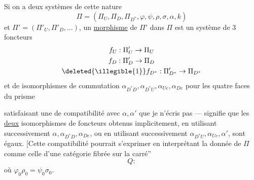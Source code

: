 Si on a deux systèmes de cette nature
\[
\Pi=(\Pi_U,\Pi_D,\Pi_{D^*},\varphi,\psi,\rho,\sigma,\alpha,k)
\]
et $\Pi'=(\Pi'_U,\Pi'_D,\ldots)$, un \uline{morphisme}
de $\Pi'$ dans $\Pi$ est un système de $3$ foncteurs
\[
\begin{gathered}
f_U:\Pi'_U\to\Pi_U\\
f_D:\Pi'_D\to\Pi_D\\
\deleted{\illegible{1}}f_{D^*}:\Pi'_{D^*}\to\Pi_{D^*}
\end{gathered}
\]
et de 
isomorphismes de commutation
$\alpha_{D^*D},\alpha_{D^*U},\alpha_{Ue},\alpha_{De}$
pour les quatre faces du prisme

satisfaisant une  de compatibilité avec $\alpha,\alpha'$ que je n'écris pas
---  signifie que les \uline{deux}
 isomorphismes de foncteurs
obtenus implicitement, en utilisant successivement
$\alpha,\alpha_{D^*D},\alpha_{De}$,  ou en
utilisant successivement $\alpha_{D^*U},\alpha_{Ue},\alpha'$, sont égaux.
[Cette compatibilité pourrait s'exprimer en interprétant la donnée
de $\Pi$ \inserted{\unsure{$\Pi$}} comme celle d'une catégorie
fibrée sur la 
 carré''
\[
Q:
\]
où $\varphi_0\rho_0=\psi_0\sigma_0$.

